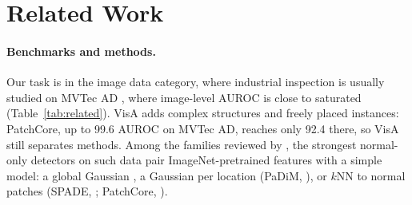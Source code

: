 \section{Related Work}
\label{sec:related}

\paragraph{Benchmarks and methods.}
Our task is in the image data category, where industrial inspection is usually studied on MVTec AD
\citep{bergmann2019mvtec}, where image-level AUROC is close to saturated (Table~\ref{tab:related}).
VisA \citep{zou2022spot} adds complex structures and freely placed instances: PatchCore, up to 99.6
AUROC on MVTec AD, reaches only 92.4 there, so VisA still separates methods.
Among the families reviewed by \citet{ruff2021unifying}, the strongest normal-only detectors on such data
pair ImageNet-pretrained features with a simple model: a global Gaussian \citep{rippel2021modeling}, a
Gaussian per location (PaDiM, \citealp{defard2021padim}), or $k$NN to normal patches (SPADE,
\citealp{cohen2020spade}; PatchCore, \citealp{roth2022towards}).

